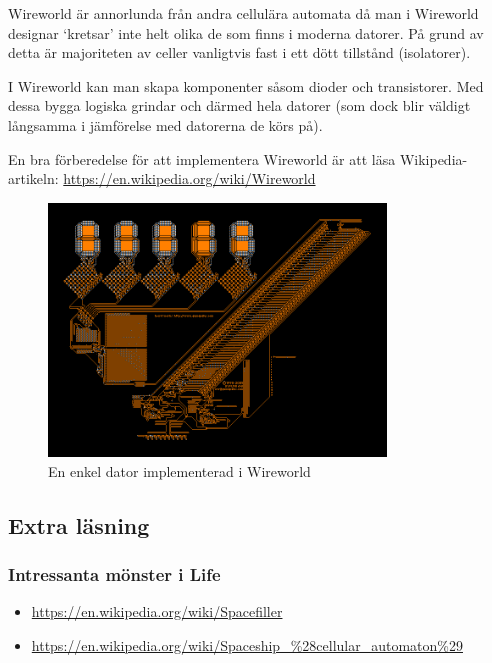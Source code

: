         Wireworld är annorlunda från andra cellulära automata då man i Wireworld designar `kretsar' inte helt olika de som finns i moderna datorer.
        På grund av detta är majoriteten av celler vanligtvis fast i ett dött tillstånd (isolatorer).

        I Wireworld kan man skapa komponenter såsom dioder och transistorer. Med dessa bygga logiska grindar och därmed hela datorer (som dock blir väldigt långsamma i jämförelse med datorerna de körs på).

        En bra förberedelse för att implementera Wireworld är att läsa Wikipedia-artikeln: \url{https://en.wikipedia.org/wiki/Wireworld}

        \begin{figure}[h]
            \begin{center}
                \includegraphics[width=0.8\textwidth]{../img/w12-lab/wireworld_computer.png}
            \end{center}
            \caption{En enkel dator implementerad i Wireworld\protect\footnotemark}
        \end{figure}


\subsection{Extra läsning}

\subsubsection{Intressanta mönster i Life}

\begin{itemize}[noitemsep,topsep=0pt]
    \item \url{https://en.wikipedia.org/wiki/Spacefiller}
    \item \url{https://en.wikipedia.org/wiki/Spaceship_\%28cellular_automaton\%29}
\end{itemize}

